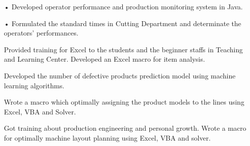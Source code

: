 \documentclass[11pt,a4paper,ragged2e,withhyper]{altacv}
\begin{document}
\begin{paracol}{2}



\large{}
\small{}
  
\par
  
• Developed operator performance and production monitoring system in Java.\par\smallskip
• Formulated the standard times in Cutting Department and determinate the operators' performances.



\divider
Provided training for Excel to the students and the beginner staffs in Teaching and Learning Center. Developed an Excel macro for item analysis.
\par


Developed the number of defective products prediction model using machine learning algorithms.

\divider

Wrote a macro which optimally assigning the product models to the lines using Excel, VBA and Solver.

\divider

Got training about production engineering and personal growth. Wrote a macro for optimally machine layout planning using Excel, VBA and solver.


\end{paracol}
\end{document}
